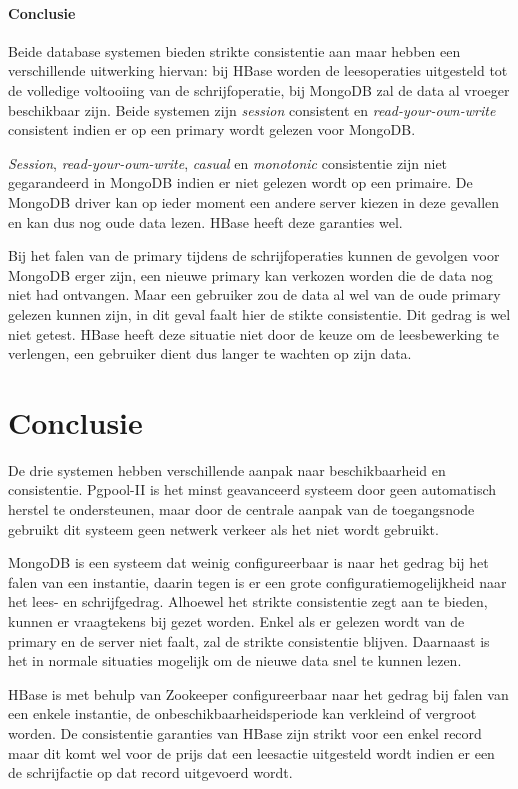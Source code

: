\paragraph{Conclusie} Beide database systemen bieden strikte consistentie aan maar hebben een verschillende uitwerking hiervan: bij HBase worden de leesoperaties uitgesteld tot de volledige voltooiing van de schrijfoperatie, bij MongoDB zal de data al vroeger beschikbaar zijn. Beide systemen zijn \textit{session} consistent en \textit{read-your-own-write} consistent indien er op een primary wordt gelezen voor MongoDB. 

\textit{Session}, \textit{read-your-own-write}, \textit{casual} en \textit{monotonic} consistentie zijn niet gegarandeerd in MongoDB indien er niet gelezen wordt op een primaire. De MongoDB driver kan op ieder moment een andere server kiezen in deze gevallen en kan dus nog oude data lezen. HBase heeft deze garanties wel. 

Bij het falen van de primary tijdens de schrijfoperaties kunnen de gevolgen voor MongoDB erger zijn, een nieuwe primary kan verkozen worden die de data nog niet had ontvangen. Maar een gebruiker zou de data al wel van de oude primary gelezen kunnen zijn, in dit geval faalt hier de stikte consistentie. Dit gedrag is wel niet getest. HBase heeft deze situatie niet door de keuze om de leesbewerking te verlengen, een gebruiker dient dus langer te wachten op zijn data. 

\section{Conclusie}
De drie systemen hebben verschillende aanpak naar beschikbaarheid en consistentie. Pgpool-II is het minst geavanceerd systeem door geen automatisch herstel te ondersteunen, maar door de centrale aanpak van de toegangsnode gebruikt dit systeem geen netwerk verkeer als het niet wordt gebruikt. 

MongoDB is een systeem dat weinig configureerbaar is naar het gedrag bij het falen van een instantie, daarin tegen is er een grote configuratiemogelijkheid naar het lees- en schrijfgedrag. Alhoewel het strikte consistentie zegt aan te bieden, kunnen er vraagtekens bij gezet worden. Enkel als er gelezen wordt van de primary en de server niet faalt, zal de strikte consistentie blijven. Daarnaast is het in normale situaties mogelijk om de nieuwe data snel te kunnen lezen. 

HBase is met behulp van Zookeeper configureerbaar naar het gedrag bij falen van een enkele instantie, de onbeschikbaarheidsperiode kan verkleind of vergroot worden. De consistentie garanties van HBase zijn strikt voor een enkel record maar dit komt wel voor de prijs dat een leesactie uitgesteld wordt indien er een de schrijfactie op dat record uitgevoerd wordt. 